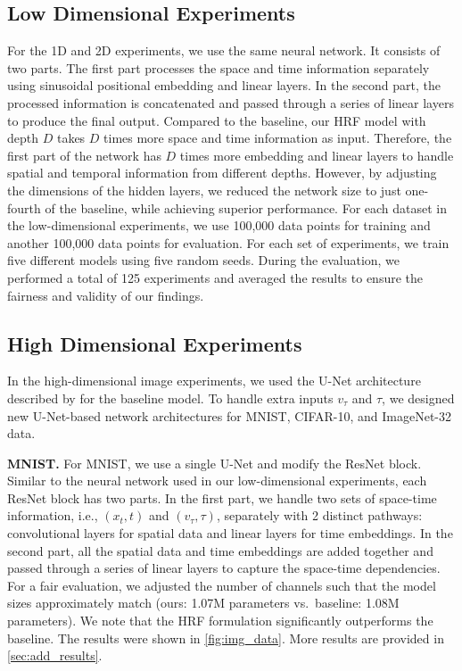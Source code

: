 \subsection{Low Dimensional Experiments}
For the 1D and 2D experiments, we use the same neural network. It consists of two parts. The first part processes the space and time information separately using sinusoidal positional embedding and linear layers. In the second part, the processed information is concatenated and passed through a series of linear layers to produce the final output. Compared to the baseline, our HRF model with depth $D$ takes $D$ times more space and time information as input. Therefore, the first part of the network has $D$ times more embedding and linear layers to handle spatial and temporal information from different depths. However, by adjusting the dimensions of the hidden layers, we reduced the network size to just one-fourth of the baseline, while achieving superior performance. For each dataset in the low-dimensional experiments, we use 100,000 data points for training and another 100,000 data points for evaluation. For each set of experiments, we train five different models using five random seeds. During the evaluation, we performed a total of 125 experiments and averaged the results to ensure the fairness and validity of our findings. 

\subsection{High Dimensional Experiments}
In the high-dimensional image experiments, we used the U-Net architecture described by \citet{LipmanICLR2023} for the baseline model. %
To handle extra inputs $v_\tau$ and $\tau$, we designed new U-Net-based network architectures for MNIST, CIFAR-10, and ImageNet-32 data. 

\noindent\textbf{MNIST.} For MNIST, we use a single U-Net and modify the ResNet block. Similar to the neural network used in our low-dimensional experiments, each ResNet block has two parts. In the first part, we handle two sets of space-time information, i.e., $(x_t,t)$ and $(v_\tau,\tau)$, separately with 2 distinct pathways: convolutional layers for spatial data and linear layers for time embeddings. In the second part, all the spatial data and time embeddings are added together and passed through a series of linear layers to capture the space-time dependencies. For a fair evaluation, we adjusted the number of channels such that the model sizes approximately match (ours: 1.07M parameters vs.\ baseline: 1.08M parameters). We note that the HRF formulation significantly outperforms the baseline. The results were shown in \cref{fig:img_data}. More results are provided in \cref{sec:add_results}.

